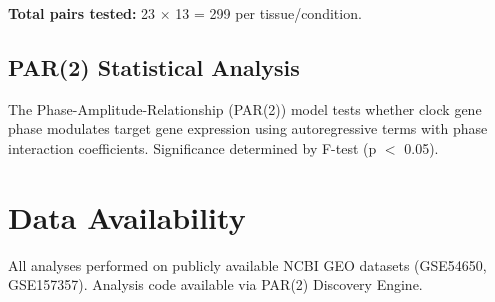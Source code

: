 \documentclass[11pt,letterpaper]{article}
\begin{document}
\textbf{Total pairs tested:} 23 $\times$ 13 = 299 per tissue/condition.

\subsection{PAR(2) Statistical Analysis}

The Phase-Amplitude-Relationship (PAR(2)) model tests whether clock gene phase modulates target gene expression using autoregressive terms with phase interaction coefficients. Significance determined by F-test (p $<$ 0.05).

\section{Data Availability}

All analyses performed on publicly available NCBI GEO datasets (GSE54650, GSE157357). Analysis code available via PAR(2) Discovery Engine.
\end{document}
